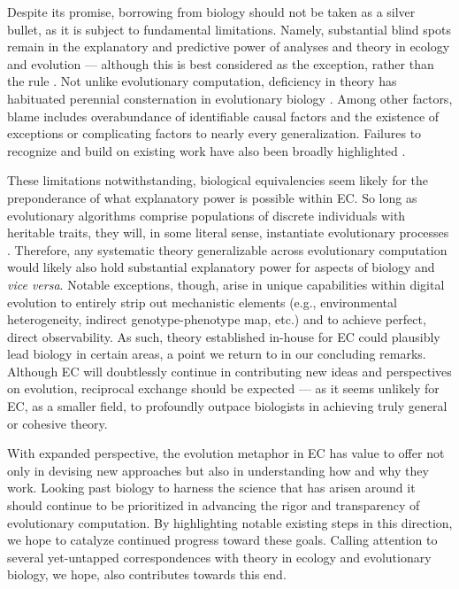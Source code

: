 




Despite its promise, borrowing from biology should not be taken as a silver bullet, as it is subject to fundamental limitations.
Namely, substantial blind spots remain in the explanatory and predictive power of analyses and theory in ecology and evolution \citep{houlahan2016priority,catford2022addressing,yates2018outstanding} --- although this is best considered as the exception, rather than the rule \citep{lynch2025complexity}.
Not unlike evolutionary computation, deficiency in theory has habituated perennial consternation in evolutionary biology \citep{welch2017wrong}.
Among other factors, blame includes overabundance of identifiable causal factors and the existence of exceptions or complicating factors to nearly every generalization.
Failures to recognize and build on existing work have also been broadly highlighted \citep{lynch2025complexity,beer2024alife}.

These limitations notwithstanding, biological equivalencies seem likely for the preponderance of what explanatory power is possible within EC.
So long as evolutionary algorithms comprise populations of discrete individuals with heritable traits, they will, in some literal sense, instantiate evolutionary processes \citep{pennock2007models}.
Therefore, any systematic theory generalizable across evolutionary computation would likely also hold substantial explanatory power for aspects of biology and \textit{vice versa}.
Notable exceptions, though, arise in unique capabilities within digital evolution to entirely strip out mechanistic elements (e.g., environmental heterogeneity, indirect genotype-phenotype map, etc.) and to achieve perfect, direct observability.
As such, theory established in-house for EC could plausibly lead biology in certain areas, a point we return to in our concluding remarks.
Although EC will doubtlessly continue in contributing new ideas and perspectives on evolution, reciprocal exchange should be expected --- as it seems unlikely for EC, as a smaller field, to profoundly outpace biologists in achieving truly general or cohesive theory.

With expanded perspective, the evolution metaphor in EC has value to offer not only in devising new approaches but also in understanding how and why they work.
Looking past biology to harness the science that has arisen around it should continue to be prioritized in advancing the rigor and transparency of evolutionary computation.
By highlighting notable existing steps in this direction, we hope to catalyze continued progress toward these goals.
Calling attention to several yet-untapped correspondences with theory in ecology and evolutionary biology, we hope, also contributes towards this end.
